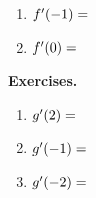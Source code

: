 \documentclass[10pt]{article}
\begin{document}
{\begin{enumerate}
\vs{\vsp}
    \item[(b)] $f'(-1)=\dotfill$  
\vs{\vsp}
    \item[(c)] $f'(0)=\dotfill$  
\vs{\vsp}
    \end{enumerate}
}{
    {\bf\color{blue}Exercises.}
    \begin{enumerate}
    \item[(a)] $g'(2)=\dotfill$  
\vs{\vsp}
    \item[(b)] $g'(-1)=\dotfill$  
\vs{\vsp}
    \item[(c)] $g'(-2)=\dotfill$  
\vs{\vsp}
    \end{enumerate}
}
\end{document}
